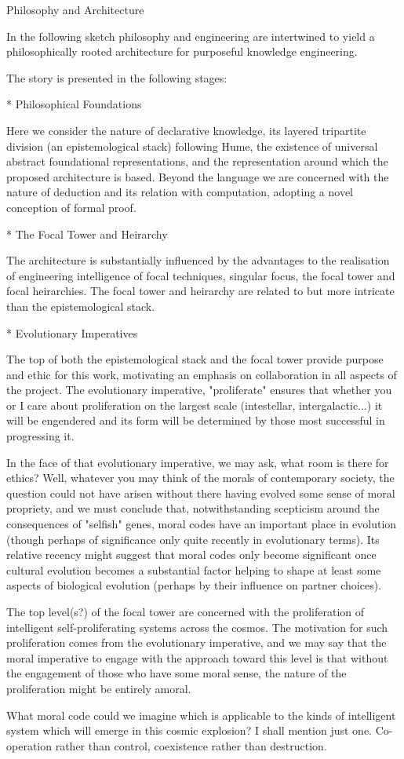 Philosophy and Architecture

In the following sketch philosophy and engineering are intertwined to yield a philosophically rooted architecture for purposeful knowledge engineering.

The story is presented in the following stages:

* Philosophical Foundations

Here we consider the nature of declarative knowledge, its layered tripartite division (an epistemological stack) following Hume, the existence of universal abstract foundational representations, and the representation around which the proposed architecture is based.
Beyond the language we are concerned with the nature of deduction and its relation with computation, adopting a novel conception of formal proof.

* The Focal Tower and Heirarchy

The architecture is substantially influenced by the advantages to the realisation of engineering intelligence of focal techniques, singular focus, the focal tower and focal heirarchies.
The focal tower and heirarchy are related to but more intricate than the epistemological stack.

* Evolutionary Imperatives

The top of both the epistemological stack and the focal tower provide purpose and ethic for this work, motivating an emphasis on collaboration in all aspects of the project.
The evolutionary imperative, "proliferate" ensures that whether you or I care about proliferation on the largest scale (intestellar, intergalactic...) it will be engendered and its form will be determined by those most successful in progressing it.

In the face of that evolutionary imperative, we may ask, what room is there for ethics?
Well, whatever you may think of the morals of contemporary society, the question could not have arisen without there having evolved some sense of moral propriety, and we must conclude that, notwithstanding scepticism around the consequences of "selfish" genes, moral codes have an important place in evolution (though perhaps of significance only quite recently in evolutionary terms).
Its relative recency might suggest that moral codes only become significant once cultural evolution becomes a substantial factor helping to shape at least some aspects of biological evolution (perhaps by their influence on partner choices).

The top level(s?) of the focal tower are concerned with the proliferation of intelligent self-proliferating systems across the cosmos.
The motivation for such proliferation comes from the evolutionary imperative, and we may say that the moral imperative to engage with the approach toward this level is that without the engagement of those who have some moral sense, the nature of the proliferation might be entirely amoral.

What moral code could we imagine which is applicable to the kinds of intelligent system which will emerge in this cosmic explosion?
I shall mention just one.
Co-operation rather than control, coexistence rather than destruction.
